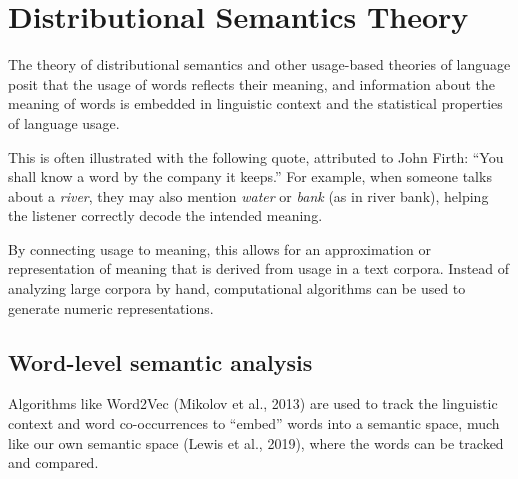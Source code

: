  
\section{Distributional Semantics Theory}

The theory of distributional semantics \cite{harris1954distributional, firth1957synopsis} and other usage-based theories of language \cite{wittgenstein1953philosophical} posit that the usage of words reflects their meaning, and information about the meaning of words is embedded in linguistic context and the statistical properties of language usage.

This is often illustrated with the following quote, attributed to John Firth: ``You shall know a word by the company it keeps.'' For example, when someone talks about a \textit{river}, they may also mention \textit{water} or \textit{bank} (as in river bank), helping the listener correctly decode the intended meaning.

By connecting usage to meaning, this allows for an approximation or representation of meaning that is derived from usage in a text corpora. Instead of analyzing large corpora by hand, computational algorithms can be used to generate numeric representations.

\subsection{Word-level semantic analysis}

Algorithms like Word2Vec (Mikolov et al., 2013) are used to track the linguistic context and word co-occurrences to ``embed'' words into a semantic space, much like our own semantic space (Lewis et al., 2019), where the words can be tracked and compared. 


